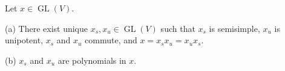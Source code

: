 Let $x \in \operatorname{GL}(V)$.

(a) There exist unique $x_s, x_u \in \operatorname{GL}(V)$ such that $x_s$ is semisimple, $x_u$ is unipotent, $x_s$ and $x_u$ commute, and $x = x_s x_u = x_u x_s$.

(b) $x_s$ and $x_u$ are polynomials in $x$.

